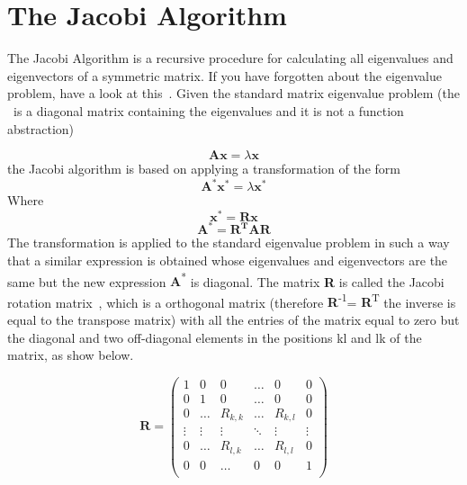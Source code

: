 \documentclass{tmr}
\begin{document}
\section{The Jacobi Algorithm}
The Jacobi Algorithm is a recursive procedure for calculating all eigenvalues
and eigenvectors of a symmetric matrix. If you have forgotten about the eigenvalue problem,
 have a look at this~\cite{eigenvalue}. Given the standard matrix eigenvalue problem 
(the \textlambda\ is a diagonal matrix containing the eigenvalues and it is not a function
abstraction)

\[\mathbf{Ax} = \lambda \mathbf{x}  \]
the Jacobi algorithm is based on applying a transformation of the form 
 \[\mathbf{A^*x^*} = \lambda \mathbf{x^*}  \]
Where
\[\mathbf{x^*} = \mathbf{Rx} \]
\[\mathbf{A^*} = \mathbf{R^TAR} \]
The transformation is applied to the standard eigenvalue problem
in such a way that a similar expression is obtained whose 
eigenvalues and eigenvectors are the same but the
new expression {\textbf A\textsuperscript{*}} is diagonal. The matrix {\bf R} 
is called the Jacobi rotation matrix~\cite{Jacobi},
which is a orthogonal matrix (therefore {\textbf R\textsuperscript{-1}}= {\textbf R\textsuperscript{T}} the
inverse is equal to the transpose matrix) with all the entries of the matrix equal
 to zero but the diagonal and two off-diagonal elements
in the positions kl and lk of the matrix, as show below.

\[
 \mathbf{R} =
\begin{pmatrix}
1 & 0 & 0 & \hdots & 0 & 0 \\
0 & 1 & 0 & \hdots & 0 & 0 \\
0 & \hdots & R_{k,k} & \hdots & R_{k,l} &  0 \\ 
\vdots & \vdots & \vdots & \ddots & \vdots & \vdots \\
0 &  \hdots & R_{l,k} & \hdots & R_{l,l} & 0 \\
0 & 0 & \hdots & 0 & 0 & 1 \\ 
\end{pmatrix}
\]
\end{document}
